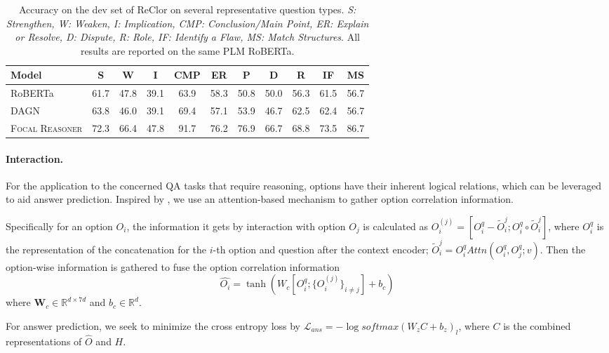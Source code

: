 \documentclass[11pt]{article}
\begin{document}
\begin{table*}[htb]
\vspace{-3mm}
\small
\setlength{\belowcaptionskip}{8.3pt}

\centering\centering\setlength{\tabcolsep}{10.3pt}
\begin{tabular}{lcccccccccc}
\toprule
Model  & S & W & I & CMP  & ER & P & D& R & IF &MS \\ 
\midrule
RoBERTa&61.7& 47.8  & 39.1 & 63.9  & 58.3 & 50.8 & 50.0 & 56.3 & 61.5 & 56.7\\
DAGN  & 63.8 & 46.0 & 39.1 & 69.4 & 57.1 & 53.9 & 46.7  & 62.5 & 62.4 & 56.7\\
\midrule
\textsc{Focal Reasoner} &72.3&66.4  & 47.8 & 91.7  & 76.2 & 76.9 & 66.7  & 68.8 & 73.5  & 86.7\\
\bottomrule
\end{tabular}
\caption{Accuracy on the dev set of ReClor on several representative question types. \textit{S: Strengthen, W: Weaken, I: Implication, CMP: Conclusion/Main Point, ER: Explain or Resolve, D: Dispute, R: Role, IF: Identify a Flaw, MS: Match Structures}. All results are reported on the same PLM RoBERTa.}\label{class}
\vspace{-3mm}
\end{table*}

\paragraph{Interaction.} For the application to the concerned QA tasks that require reasoning, options have their inherent logical relations, which can be leveraged to aid answer prediction. Inspired by \citep{ran2019option}, we use an attention-based mechanism to gather option correlation information. 

Specifically for an option $O_i$, the information it gets by interaction with option $O_j$ is calculated as
    $O_i^{(j)} = [O_i^q-\tilde{O}_i^{j};O_i^q\circ \tilde{O}_i^{j}]$,
where $O_i^q$ is the representation of the concatenation for the $i$-th option and question after the context encoder; $\tilde{O}_i^{j} = O_i^qAttn(O_i^q,O_j^q; v)$. Then the option-wise information is gathered to fuse the option correlation information
\begin{equation}
    \hat{O_i}=\tanh (W_c[O_i^q;\{O_i^{(j)}\}_{i\neq j}]+b_c)
\end{equation}
where $\textbf{W}_c\in \mathbb{R}^{d\times 7d}$ and $b_c\in\mathbb{R}^d$. 

For answer prediction, we seek to minimize the cross entropy loss by $\mathcal{L}_{ans}=-\log softmax(W_zC+b_z)_l$, where $C$ is the combined representations of $\hat{O}$ and $H$. 
\end{document}
